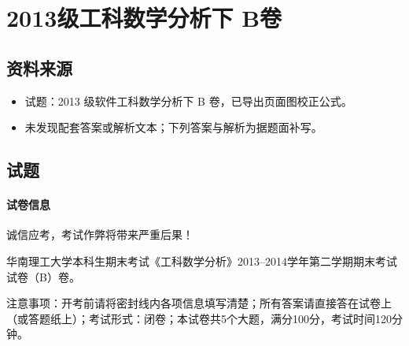 \section{2013级工科数学分析下 B卷}

\subsection{资料来源}
\begin{itemize}
  \item 试题：2013 级软件工科数学分析下 B 卷，已导出页面图校正公式。
  \item 未发现配套答案或解析文本；下列答案与解析为据题面补写。
\end{itemize}

\subsection{试题}

\paragraph*{试卷信息}
诚信应考，考试作弊将带来严重后果！

华南理工大学本科生期末考试《工科数学分析》2013--2014学年第二学期期末考试试卷（B）卷。

注意事项：开考前请将密封线内各项信息填写清楚；所有答案请直接答在试卷上（或答题纸上）；考试形式：闭卷；本试卷共5个大题，满分100分，考试时间120分钟。

